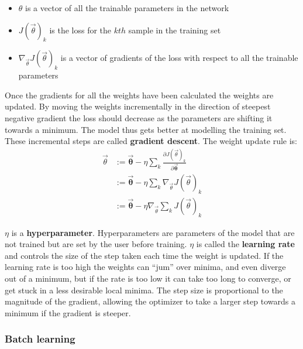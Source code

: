 \begin{itemize}
  \item $\theta$ is a vector of all the trainable parameters in the network
  \item $J(\vec{\theta})_k$ is the loss for the $kth$ sample in the training set
  \item $\nabla_{\vec{\theta}} J(\vec{\theta})_k$ is a vector of gradients of the loss with respect to all the trainable parameters 
\end{itemize}

Once the gradients for all the weights have been calculated the weights are updated. By moving the weights incrementally in the direction of steepest 
negative gradient the loss should decrease as the parameters are shifting it towards a minimum. The model thus gets
better at modelling the training set. These incremental steps are called \textbf{gradient descent}. The weight update rule is: 
\begin{align}
  \vec{\theta} & := \mathbf{\vec{\theta}} - \eta \sum_{k} \frac{\partial J(\vec{\theta})_k}{\partial \mathbf{\vec{\theta}}} \\
  & := \mathbf{\vec{\theta}} - \eta \sum_{k} \nabla_{\vec{\theta}} J(\vec{\theta})_k \\
  & := \mathbf{\vec{\theta}} - \eta \nabla_{\vec{\theta}} \sum_{k} J(\vec{\theta})_k \label{eq:weight}
\end{align}

$\eta$ is a \textbf{hyperparameter}. Hyperparameters are parameters of the model that are not trained but are set by the user before training.
$\eta$ is called the \textbf{learning rate} and controls the size of the step taken each time the weight is updated. If the learning rate is 
too high the weights can ``jum'' over minima, and even diverge out of a minimum, but if the rate is too low it can take too long to converge,
or get stuck in a less desirable local minima. The step size is proportional to the magnitude of the gradient, allowing the optimizer to 
take a larger step towards a minimum if the gradient is steeper.

\subsubsection{Batch learning} \label{batch}

